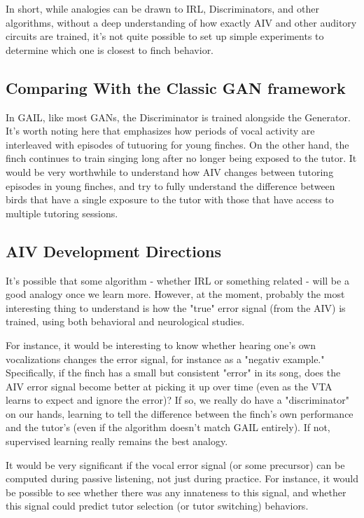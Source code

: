 \documentclass[aps,prl,preprint,groupedaddress]{revtex4-1}
\begin{document}
In short, while analogies can be drawn to IRL, Discriminators, and other algorithms, 
without a deep understanding of how exactly AIV and other auditory circuits are trained, 
it's not quite possible to set up simple experiments to determine which one is closest to finch behavior.

\subsection{Comparing With the Classic GAN framework}

In GAIL, like most GANs, the Discriminator is trained alongside the Generator. 
It's worth noting here that \cite{hvcmem}
emphasizes how periods of vocal activity are interleaved with episodes of tutuoring for young finches. 
On the other hand, the finch continues to train singing long after no longer being exposed to the tutor. 
It would be very worthwhile to understand how AIV changes between tutoring episodes in young finches, 
and try to fully understand the difference between birds that have a single exposure to the tutor 
with those that have access to multiple tutoring sessions.

\subsection{AIV Development Directions}

It's possible that some algorithm - whether IRL or something related - will be a good analogy once we learn more. 
However, at the moment, probably the most interesting thing to understand is how the "true" error signal (from the AIV) is trained, 
using both behavioral and neurological studies. 

For instance, it would be interesting to know whether hearing one's own vocalizations changes the error signal, 
for instance as a "negativ example."
Specifically, if the finch has a small but consistent "error" in its song, does the AIV error signal become better at picking it up over time 
(even as the VTA learns to expect and ignore the error)? 
If so, we really do have a "discriminator" on our hands, learning to tell the difference between the finch's own performance and the tutor's 
(even if the algorithm doesn't match GAIL entirely). 
If not, supervised learning really remains the best analogy.

It would be very significant if the vocal error signal (or some precursor) can be computed during passive listening, not just during practice. 
For instance, it would be possible to see whether there was any innateness to this signal, 
and whether this signal could predict tutor selection (or tutor switching) behaviors. 
\end{document}
